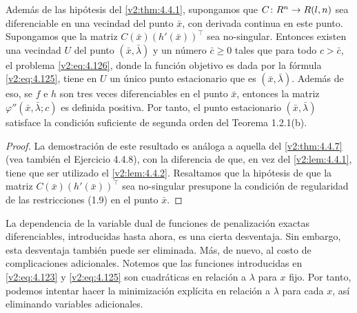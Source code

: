 \begin{theorem}\label{v2:thm:4.4.8}
    Además de las hipótesis del \cref{v2:thm:4.4.1}, supongamos que $C \colon R^n \to R(l, n)$ sea diferenciable en una vecindad del punto $\bar{x}$, con derivada continua en este punto. Supongamos que la matriz $C(\bar{x})(h'(\bar{x}))^\top$ sea no-singular.
    Entonces existen una vecindad $U$ del punto $(\bar{x}, \bar{\lambda})$ y un número $\bar{c} \ge 0$ tales que para todo $c > \bar{c}$, el problema \eqref{v2:eq:4.126}, donde la función objetivo es dada por la fórmula \eqref{v2:eq:4.125}, tiene en $U$ un único punto estacionario que es $(\bar{x}, \bar{\lambda})$. Además de eso, se $f$ e $h$ son tres veces diferenciables en el punto $\bar{x}$, entonces la matriz $\varphi''(\bar{x}, \bar{\lambda}; c)$ es definida positiva. Por tanto, el punto estacionario $(\bar{x}, \bar{\lambda})$ satisface la condición suficiente de segunda orden del Teorema 1.2.1(b).
\end{theorem}
\begin{proof}
    La demostración de este resultado es análoga a aquella del \cref{v2:thm:4.4.7} (vea también el Ejercicio 4.4.8), con la diferencia de que, en vez del \cref{v2:lem:4.4.1}, tiene que ser utilizado el \cref{v2:lem:4.4.2}. Resaltamos que la hipótesis de que la matriz $C(\bar{x})(h'(\bar{x}))^\top$ sea no-singular presupone la condición de regularidad de las restricciones (1.9) en el punto $\bar{x}$.
\end{proof}

La dependencia de la variable dual de funciones de penalización exactas diferenciables, introducidas hasta ahora, es una cierta desventaja. Sin embargo, esta desventaja también puede ser eliminada. Más, de nuevo, al costo de complicaciones adicionales. Notemos que las funciones introducidas en \eqref{v2:eq:4.123} y \eqref{v2:eq:4.125} son cuadráticas en relación a $\lambda$ para $x$ fijo. Por tanto, podemos intentar hacer la minimización explícita en relación a $\lambda$ para cada $x$, así eliminando variables adicionales.

